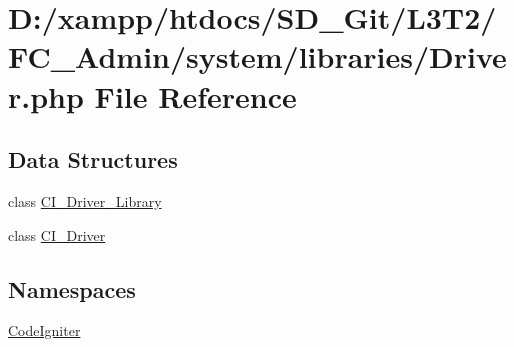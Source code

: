 \hypertarget{system_2libraries_2_driver_8php}{}\section{D\+:/xampp/htdocs/\+S\+D\+\_\+\+Git/\+L3\+T2/\+F\+C\+\_\+\+Admin/system/libraries/\+Driver.php File Reference}
\label{system_2libraries_2_driver_8php}
\subsection*{Data Structures}
\begin{DoxyCompactItemize}
\item 
class \hyperlink{class_c_i___driver___library}{C\+I\+\_\+\+Driver\+\_\+\+Library}
\item 
class \hyperlink{class_c_i___driver}{C\+I\+\_\+\+Driver}
\end{DoxyCompactItemize}
\subsection*{Namespaces}
\begin{DoxyCompactItemize}
\item 
 \hyperlink{namespace_code_igniter}{Code\+Igniter}
\end{DoxyCompactItemize}
